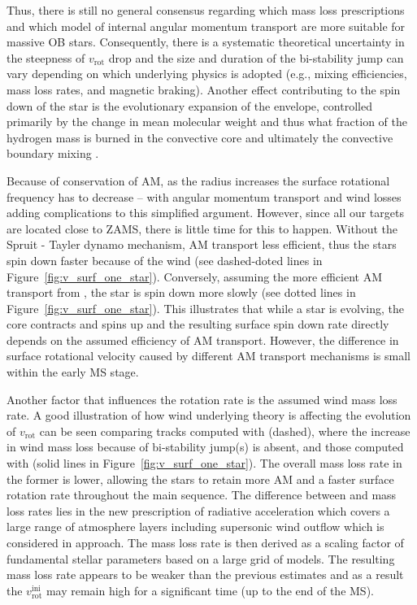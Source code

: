 \documentclass{aa}
\DeclareRobustCommand{\Figref}[1]{Figure~\ref{#1}}
\begin{document}
Thus, there is still no general consensus regarding
which mass loss prescriptions \citep{smith:14, renzo:17,
  Keszthelyi_2017, bjorklund:21, Bjorklund_2023} and which model of
internal angular momentum transport \citep[e.g.,][]{fuller:19,
  denhartogh:20, Gormaz_2023} are more suitable for massive OB stars.
Consequently, there is a systematic theoretical uncertainty
  in the steepness of $v_\mathrm{rot}$ drop and
the size and duration of the bi-stability jump can vary depending on
which underlying physics is adopted (e.g., mixing efficiencies,
mass loss rates, and magnetic braking). Another effect
  contributing to the spin down of the star is the evolutionary
expansion of the envelope, controlled primarily by the change in
  mean molecular weight \citep[e.g.,][]{xin:22} and thus
  what fraction of the hydrogen mass is burned in the convective
  core and ultimately the convective boundary mixing \cite[e.g.,][]{Brott_2011, johnston:21}.


Because of conservation of AM, as the radius increases the surface rotational frequency has to decrease -- with angular momentum transport and wind losses adding complications to this simplified argument.
However, since all our targets are located close to ZAMS, there is little time for this to happen.
Without the Spruit - Tayler dynamo mechanism, AM transport less efficient, thus the stars spin down faster because of the wind (see dashed-doted lines in \Figref{fig:v_surf_one_star}).
Conversely, assuming the more efficient AM transport from \citet{fuller:19}, the star is spin down more slowly (see dotted lines in \Figref{fig:v_surf_one_star}).
This illustrates that while a star is evolving, the core contracts and spins up and the resulting surface spin down rate directly depends on the assumed efficiency of AM transport.
However, the difference in surface rotational velocity caused by different AM transport mechanisms is small within the early MS stage.

Another factor that influences the rotation rate is the assumed wind mass loss rate.
A good illustration of how wind underlying theory is affecting the evolution of $v_\mathrm{rot}$ can be seen comparing tracks computed with \citet{Bjorklund_2023} (dashed), where the increase in wind mass loss because of bi-stability jump(s) is absent, and those computed with \citet{Vink_2001} (solid lines in \Figref{fig:v_surf_one_star}).
The overall mass loss rate in the former is lower, allowing the stars to retain more AM and a faster surface rotation rate throughout the main sequence.
The difference between \citeauthor{Bjorklund_2023} and \citeauthor{Vink_2001} mass loss rates lies in the new prescription of radiative acceleration which covers a large range of atmosphere layers including supersonic wind outflow which is considered in \citet{Bjorklund_2023} approach.
The mass loss rate is then derived as a scaling factor of fundamental stellar parameters based on a large grid of models.
The resulting mass loss rate appears to be weaker than the previous estimates and as a result the $v_\mathrm{rot}^\mathrm{ini}$ may remain high for a significant time (up to the end of the MS).
\end{document}
